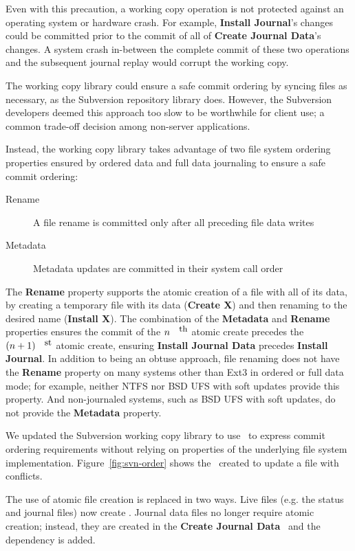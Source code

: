 Even with this precaution, a working copy operation is not protected
against an operating system or hardware crash.
%
For example, \textbf{Install Journal}'s changes could be committed
prior to the commit of all of \textbf{Create Journal Data}'s changes.
%
A system crash in-between the complete commit of these two operations
and the subsequent journal replay would corrupt the working copy.

The working copy library could ensure a safe commit ordering by
syncing files as necessary, as the Subversion repository library does.
%
However, the Subversion developers deemed this approach too slow to be
worthwhile for client use; a common trade-off decision among non-server
applications.

Instead, the working copy library takes advantage of two file system
ordering properties ensured by ordered data and full data journaling
to ensure a safe commit ordering:
\begin{description}
\item[Rename] A file rename is committed only after all preceding file
  data writes
\item[Metadata] Metadata updates are committed in their system call order
\end{description}
%
The \textbf{Rename} property supports the atomic creation of a file
with all of its data, by creating a temporary file with its data
(\textbf{Create X}) and then renaming to the desired name
(\textbf{Install X}).
%
The combination of the \textbf{Metadata} and \textbf{Rename}
properties ensures the commit of the $n^{\mbox{\small{th}}}$ atomic
create precedes the \((n+1)^{\mbox{\small{st}}}\) atomic create,
ensuring \textbf{Install Journal Data} precedes \textbf{Install
  Journal}.
%
In addition to being an obtuse approach, file renaming does not have
the \textbf{Rename} property on many systems other than Ext3 in
ordered or full data mode; for example, neither NTFS nor BSD UFS with
soft updates provide this property.
%
And non-journaled systems, such as BSD UFS with soft updates, do not
provide the \textbf{Metadata} property.

We updated the Subversion working copy library to use \opgroups\ to
express commit ordering requirements without relying on properties of the
underlying file system implementation.
%
Figure~\ref{fig:svn-order} shows the \opgroups\ created to update a
file with conflicts.

The use of atomic file creation is replaced in two ways.
%
Live files (e.g. the status and journal files) now create
.
%
Journal data files no longer require atomic creation; instead, they
are created in the \textbf{Create Journal Data} \opgroup\ and the
dependency is added.


